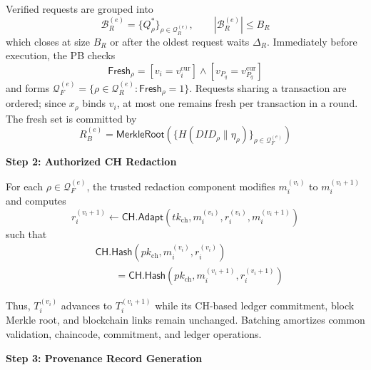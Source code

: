 \documentclass[lettersize,journal]{IEEEtran}
\begin{document}
Verified requests are grouped into
\begin{equation}
\mathcal{B}_{R}^{(e)}
=
\{Q_\rho^{*}\}_{\rho\in\mathcal{Q}_R^{(e)}},
\qquad
|\mathcal{B}_{R}^{(e)}|\le B_R
\label{eq:redaction-batch}
\end{equation}
which closes at size $B_R$ or after the oldest request waits $\Delta_R$.
Immediately before execution, the PB checks
\begin{equation}
\mathsf{Fresh}_\rho=
[v_i=v_i^{\mathrm{cur}}]\land
[v_{P_q}=v_{P_q}^{\mathrm{cur}}]
\label{eq:redaction-revalidation}
\end{equation}
and forms
$\mathcal{Q}_F^{(e)}
=\{\rho\in\mathcal{Q}_R^{(e)}:\mathsf{Fresh}_\rho=1\}$.
Requests sharing a transaction are ordered; since $x_\rho$ binds $v_i$,
at most one remains fresh per transaction in a round. The fresh set is
committed by
\begin{equation}
R_B^{(e)}
=
\mathsf{MerkleRoot}
\left(
\{H(DID_\rho\parallel\eta_\rho)\}_{\rho\in\mathcal{Q}_F^{(e)}}
\right)
\label{eq:redaction-batch-root}
\end{equation}

\smallskip
\noindent\textbf{Step 2: Authorized CH Redaction}

For each $\rho\in\mathcal{Q}_F^{(e)}$, the trusted redaction component
modifies $m_i^{(v_i)}$ to $m_i^{(v_i+1)}$ and computes
\begin{equation}
r_i^{(v_i+1)}
\leftarrow
\mathsf{CH.Adapt}
(tk_{\mathrm{ch}},m_i^{(v_i)},r_i^{(v_i)},m_i^{(v_i+1)})
\label{eq:ch-adapt}
\end{equation}
such that
\begin{equation}
\begin{aligned}
&\mathsf{CH.Hash}(pk_{\mathrm{ch}},m_i^{(v_i)},r_i^{(v_i)})\\
&\qquad=
\mathsf{CH.Hash}(pk_{\mathrm{ch}},m_i^{(v_i+1)},r_i^{(v_i+1)})
\end{aligned}
\label{eq:ch-collision}
\end{equation}

Thus, $T_i^{(v_i)}$ advances to $T_i^{(v_i+1)}$ while its CH-based
ledger commitment, block Merkle root, and blockchain links remain
unchanged. Batching amortizes common validation, chaincode, commitment,
and ledger operations.

\smallskip
\noindent\textbf{Step 3: Provenance Record Generation}
\end{document}
